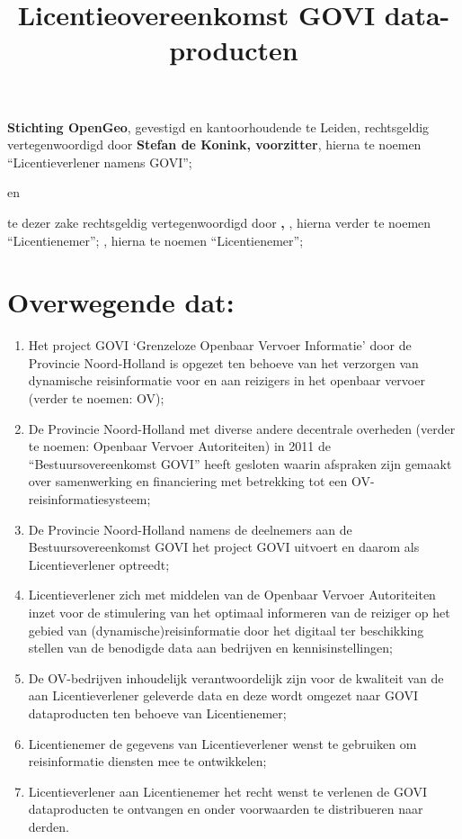 \documentclass[10pt, a4paper]{article}
\title{Licentieovereenkomst GOVI data-producten\vspace{-2ex}}
\begin{document}
\maketitle
\thispagestyle{empty}
\pagestyle{empty}
\textbf{Stichting OpenGeo}, gevestigd en kantoorhoudende te Leiden, rechtsgeldig vertegenwoordigd door \textbf{Stefan de Konink, voorzitter}, hierna te noemen ``Licentieverlener namens GOVI'';
\begin{center}
en\\
\end{center}
\ifdefined\onderneming
    \hyphenation{\tekenbevoegd}
    \textbf{\onderneming} te dezer zake rechtsgeldig vertegenwoordigd door \textbf{\tekenbevoegd, \functie}, hierna verder te noemen ``Licentienemer'';
\else
    \textbf{\tekenbevoegd}, hierna te noemen ``Licentienemer'';
\fi

\section*{Overwegende dat:}
\begin{enumerate}
\item Het project GOVI `Grenzeloze Openbaar Vervoer Informatie' door de Provincie Noord-Holland is opgezet ten behoeve van het verzorgen van dynamische reisinformatie voor en aan reizigers in het openbaar vervoer (verder te noemen: OV);
\item De Provincie Noord-Holland met diverse andere decentrale overheden (verder te noemen: Openbaar Vervoer Autoriteiten) in 2011 de ``Bestuursovereenkomst GOVI'' heeft gesloten waarin afspraken zijn gemaakt over samenwerking en financiering met betrekking tot een OV-reisinformatiesysteem;
\item De Provincie Noord-Holland namens de deelnemers aan de Bestuursovereenkomst GOVI het project GOVI uitvoert en daarom als Licentieverlener optreedt;
\item Licentieverlener zich met middelen van de Openbaar Vervoer Autoriteiten inzet voor de stimulering van het optimaal informeren van de reiziger op het gebied van (dynamische)reisinformatie door het digitaal ter beschikking stellen van de benodigde data aan bedrijven en kennisinstellingen;
\item De OV-bedrijven inhoudelijk verantwoordelijk zijn voor de kwaliteit van de aan Licentieverlener  geleverde data en deze wordt omgezet naar GOVI dataproducten ten behoeve van Licentienemer;
\item Licentienemer de gegevens van Licentieverlener wenst te gebruiken om reisinformatie diensten mee te ontwikkelen;
\item Licentieverlener aan Licentienemer het recht wenst te verlenen de GOVI dataproducten te ontvangen en onder voorwaarden te distribueren naar derden.
\end{enumerate}
\end{document}
